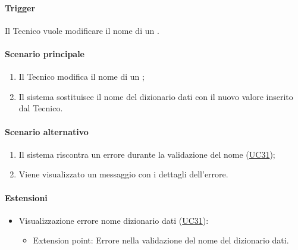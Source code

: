 \paragraph*{Trigger}
Il Tecnico vuole modificare il nome di un .

\paragraph*{Scenario principale}
\begin{enumerate}
  \item Il Tecnico modifica il nome di un ;
  \item Il sistema sostituisce il nome del dizionario dati con il nuovo valore inserito dal Tecnico.
\end{enumerate}

\paragraph*{Scenario alternativo}
\begin{enumerate}
  \item Il sistema riscontra un errore durante la validazione del nome (\hyperref[UC31]{UC31});
  \item Viene visualizzato un messaggio con i dettagli dell'errore.
\end{enumerate}

\paragraph*{Estensioni}
\begin{itemize}
  \item Visualizzazione errore nome dizionario dati (\hyperref[UC31]{UC31}):
  \begin{itemize}
    \item Extension point: Errore nella validazione del nome del dizionario dati.
  \end{itemize}
\end{itemize}